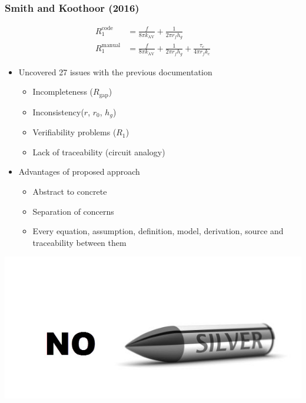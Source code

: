 \documentclass[t,12pt,numbers,fleqn]{beamer}
\begin{document}
\begin{frame}[fragile]

\frametitle{Smith and Koothoor (2016) \cite{SmithAndKoothoor2016}}

\begin{align}
R_1^{\mathrm{code}} &= \frac{f}{8\pi k_{\mathrm{AV}}} + \frac{1}{2\pi r_f h_g} \\
 R_1^{\mathrm{manual}} & = \frac {f}{8 \pi k_{\mathrm{AV}}}+ \frac{1}{2\pi r_f h_g}+\frac{\tau_c}{4\pi r_f k_c}
\end{align}

 
\begin{itemize}
\item Uncovered 27 issues with the previous documentation
\begin{itemize}
\item Incompleteness ($R_{\mbox{gap}}$)
\item Inconsistency($r$, $r_0$, $h_g$)
\item Verifiability problems ($R_1$)
\item Lack of traceability (circuit analogy)
\end{itemize}
\item Advantages of proposed approach
\begin{itemize}
\item Abstract to concrete
\item Separation of concerns
\item Every equation, assumption, definition, model, derivation, source and
  traceability between them
\end{itemize}
\end{itemize}

\end{frame}




\begin{frame}
\includegraphics[width=\textwidth]{../Figures/no_silver_bullet.jpg}
\end{frame}
\end{document}
